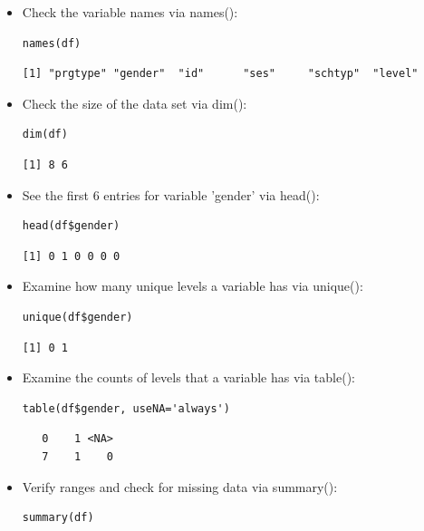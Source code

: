 \begin{frame}
\begin{itemize}
\newpage
		\item Check the variable names via \ttfamily names(): \normalfont 
\begin{lstlisting}
names(df)
\end{lstlisting}

{ \footnotesize
	\begin{verbatim}
[1] "prgtype" "gender"  "id"      "ses"     "schtyp"  "level"
	\end{verbatim}
}	
		\item Check the size of the data set via \ttfamily dim(): \normalfont 
\begin{lstlisting}
dim(df)
\end{lstlisting}

\begin{verbatim}
[1] 8 6
\end{verbatim}	
		\item See the first 6 entries for variable 'gender' via \ttfamily head(): \normalfont 
\begin{lstlisting}
head(df$gender)
\end{lstlisting}

\begin{verbatim}
[1] 0 1 0 0 0 0
\end{verbatim}	

\newpage
	\item Examine how many unique levels a variable has via \ttfamily unique(): \normalfont
\begin{lstlisting}
unique(df$gender)
\end{lstlisting}

\begin{verbatim}
[1] 0 1
\end{verbatim}	
	\item Examine the counts of levels that a variable has via \ttfamily table(): \normalfont
\begin{lstlisting}
table(df$gender, useNA='always')
\end{lstlisting}

\begin{verbatim}
   0    1 <NA> 
   7    1    0 
\end{verbatim}	

\newpage
		\item Verify ranges and check for missing data via \ttfamily summary(): \normalfont 
\begin{lstlisting}
summary(df)
\end{lstlisting}


\end{itemize}
\end{frame}
